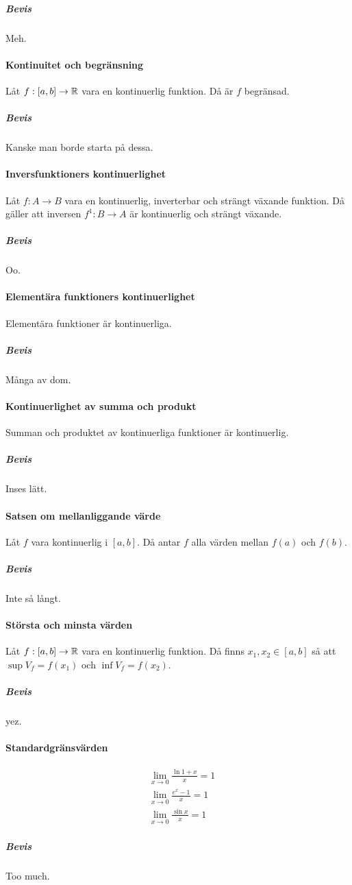 \subparagraph{Bevis}
Meh.

\paragraph{Kontinuitet och begränsning}
Låt $f: [a,b]\to\mathbb{R}$ vara en kontinuerlig funktion. Då är $f$ begränsad.

\subparagraph{Bevis}
Kanske man borde starta på dessa.

\paragraph{Inversfunktioners kontinuerlighet}
Låt $f: A\to B$ vara en kontinuerlig, inverterbar och strängt växande funktion. Då gäller att inversen $f^{1}: B\to A$ är kontinuerlig och strängt växande.

\subparagraph{Bevis}
Oo.

\paragraph{Elementära funktioners kontinuerlighet}
Elementära funktioner är kontinuerliga.

\subparagraph{Bevis}
Många av dom.

\paragraph{Kontinuerlighet av summa och produkt}
Summan och produktet av kontinuerliga funktioner är kontinuerlig.

\subparagraph{Bevis}
Inses lätt.

\paragraph{Satsen om mellanliggande värde}
Låt $f$ vara kontinuerlig i $[a, b]$. Då antar $f$ alla värden mellan $f(a)$ och $f(b)$.

\subparagraph{Bevis}
Inte så långt.

\paragraph{Största och minsta värden}
Låt $f: [a,b]\to\mathbb{R}$ vara en kontinuerlig funktion. Då finns $x_1, x_2\in [a,b]$ så att $\sup{V_f} = f(x_1)$ och $\inf{V_f} = f(x_2)$.

\subparagraph{Bevis}
yez.

\paragraph{Standardgränsvärden}
\begin{align*}
	&\lim\limits_{x\to 0}\frac{\ln{1 + x}}{x} = 1 \\
	&\lim\limits_{x\to 0}\frac{e^x - 1}{x} = 1 \\
	&\lim\limits_{x\to 0}\frac{\sin{x}}{x} = 1
\end{align*}

\subparagraph{Bevis}
Too much.